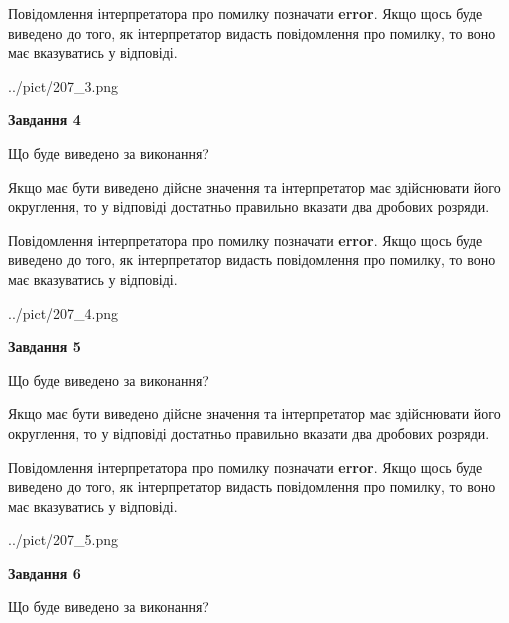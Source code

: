 \documentclass[12pt, ukrainian]{article}
\begin{document}
{\begin {Large}
Повідомлення інтерпретатора про помилку позначати \textbf{error}.
Якщо щось буде виведено до того, як інтерпретатор видасть повідомлення про помилку, 
то воно має вказуватись у відповіді. \par

\begin{center}
	{../pict/207_3.png}
\end{center}
\newpage

{\begin {center}\textbf{Завдання 4}\end {center}}\par
Що буде виведено за виконання? \par

Якщо має бути виведено дійсне значення та інтерпретатор має здійснювати його округлення, 
то у відповіді достатньо правильно вказати два дробових розряди.

Повідомлення інтерпретатора про помилку позначати \textbf{error}.
Якщо щось буде виведено до того, як інтерпретатор видасть повідомлення про помилку, 
то воно має вказуватись у відповіді. \par

\begin{center}
	{../pict/207_4.png}
\end{center}
\newpage

{\begin {center}\textbf{Завдання 5}\end {center}}\par
Що буде виведено за виконання? \par

Якщо має бути виведено дійсне значення та інтерпретатор має здійснювати його округлення, 
то у відповіді достатньо правильно вказати два дробових розряди.

Повідомлення інтерпретатора про помилку позначати \textbf{error}.
Якщо щось буде виведено до того, як інтерпретатор видасть повідомлення про помилку, 
то воно має вказуватись у відповіді. \par

\begin{center}
	{../pict/207_5.png}
\end{center}
\newpage

{\begin {center}\textbf{Завдання 6}\end {center}}\par
Що буде виведено за виконання? \par


\end{Large}}
\end{document}
